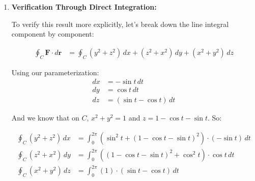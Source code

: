 \begin{example}
\begin{solution}
\begin{enumerate}
    Therefore:
    \[
    \nabla \times \mathbf{F} = (2y - 2z)\mathbf{i} + (2z - 2x)\mathbf{j} + (2x - 2y)\mathbf{k}
    \]
    
    Now, we need the unit normal vector to the plane $x + y + z = 1$. The gradient of the plane is:
    \[
    \nabla(x + y + z - 1) = \langle 1, 1, 1 \rangle
    \]
    
    The unit normal is:
    \[
    \mathbf{n} = \frac{\langle 1, 1, 1 \rangle}{\|\langle 1, 1, 1 \rangle\|} = \frac{\langle 1, 1, 1 \rangle}{\sqrt{3}} = \frac{1}{\sqrt{3}}\langle 1, 1, 1 \rangle
    \]
    
    Computing the dot product:
    \[
    \begin{aligned}
    (\nabla \times \mathbf{F}) \cdot \mathbf{n} &= \frac{1}{\sqrt{3}}((2y - 2z) + (2z - 2x) + (2x - 2y)) \\
    &= \frac{1}{\sqrt{3}}(0) = 0
    \end{aligned}
    \]
    
    Since the dot product is zero, the surface integral is:
    \[
    \iint_\Sigma (\nabla \times \mathbf{F}) \cdot \mathbf{n}\,d\Sigma = 0
    \]
    
    Therefore, by Stokes' Theorem:
    \[
    \oint_C \mathbf{F} \cdot d\mathbf{r} = 0
    \]
    
    \item \textbf{Verification Through Direct Integration:}
    
    To verify this result more explicitly, let's break down the line integral component by component:
    
    \begin{align*}
    \oint_C \mathbf{F} \cdot d\mathbf{r} &= \oint_C (y^2 + z^2)\,dx + (z^2 + x^2)\,dy + (x^2 + y^2)\,dz
    \end{align*}
    
    Using our parameterization:
    \begin{align*}
    dx &= -\sin t\,dt \\
    dy &= \cos t\,dt \\
    dz &= (\sin t - \cos t)\,dt
    \end{align*}
    
    And we know that on $C$, $x^2 + y^2 = 1$ and $z = 1-\cos t-\sin t$. So:
    
    \begin{align*}
    \oint_C (y^2 + z^2)\,dx &= \int_0^{2\pi} (\sin^2 t + (1-\cos t-\sin t)^2) \cdot (-\sin t)\,dt \\
    \oint_C (z^2 + x^2)\,dy &= \int_0^{2\pi} ((1-\cos t-\sin t)^2 + \cos^2 t) \cdot \cos t\,dt \\
    \oint_C (x^2 + y^2)\,dz &= \int_0^{2\pi} (1) \cdot (\sin t - \cos t)\,dt
    \end{align*}
    

\end{enumerate}
\end{solution}
\end{example}
